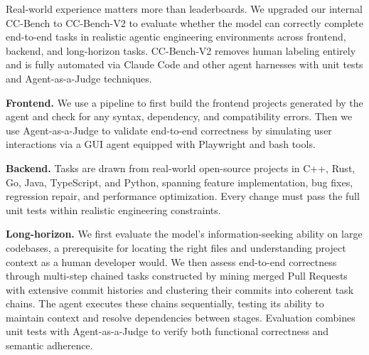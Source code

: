 Real-world experience matters more than leaderboards. We upgraded our internal CC-Bench to CC-Bench-V2 to evaluate whether the model can correctly complete end-to-end tasks in realistic agentic engineering environments across frontend, backend, and long-horizon tasks. CC-Bench-V2 removes human labeling entirely and is fully automated via Claude Code and other agent harnesses with unit tests and Agent-as-a-Judge techniques.

\textbf{Frontend.} We use a pipeline to first build the frontend projects generated by the agent and check for any syntax, dependency, and compatibility errors. Then we use Agent-as-a-Judge to validate end-to-end correctness by simulating user interactions via a GUI agent equipped with Playwright and bash tools.

\textbf{Backend.} Tasks are drawn from real-world open-source projects in C++, Rust, Go, Java, TypeScript, and Python, spanning feature implementation, bug fixes, regression repair, and performance optimization. Every change must pass the full unit tests within realistic engineering constraints.

\textbf{Long-horizon.} We first evaluate the model's information-seeking ability on large codebases, a prerequisite for locating the right files and understanding project context as a human developer would. We then assess end-to-end correctness through multi-step chained tasks constructed by mining merged Pull Requests with extensive commit histories and clustering their commits into coherent task chains. The agent executes these chains sequentially, testing its ability to maintain context and resolve dependencies between stages. Evaluation combines unit tests with Agent-as-a-Judge to verify both functional correctness and semantic adherence.

